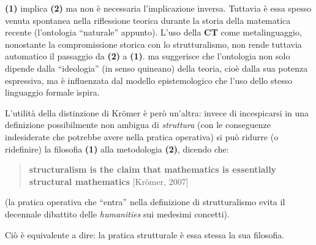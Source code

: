 \documentclass[a4paper, 11pt]{article}
\begin{document}
	\textbf{(1)} implica \textbf{(2)} ma non è necessaria l'implicazione inversa. \endfo Tuttavia è essa spesso venuta spontanea nella riflessione teorica durante la storia della matematica recente (l'ontologia ``naturale'' appunto). L'uso della \textbf{CT} come metalinguaggio, nonostante la compromissione storica con lo strutturalismo, non rende tuttavia automatico il passaggio da \textbf{(2)} a \textbf{(1)}. ma suggerisce che l'ontologia non solo dipende dalla ``ideologia'' (in senso quineano) della teoria, cioè dalla sua potenza espressiva, ma è influenzata dal modello epistemologico che l'uso dello stesso linguaggio formale ispira.
	
	L'utilità della distinzione di Kr\"omer è però un'altra: invece di incespicarsi in una definizione possibilmente non ambigua di \textit{struttura} (con le conseguenze indesiderate che potrebbe avere nella pratica operativa) si può ridurre (o ridefinire) la filosofia \textbf{(1)} alla metodologia \textbf{(2)}, dicendo che:
	\begin{quotation}
		\textbf{structuralism is the claim that mathematics
			is essentially structural mathematics} [Kr\"omer, 2007]
	\end{quotation}
	(la pratica operativa che ``entra'' nella definizione di strutturalismo evita il decennale dibattito delle \textit{humanities} sui medesimi concetti).
	
	Ciò è equivalente a dire: la pratica strutturale è essa stessa la sua filosofia.
	
\end{document}
